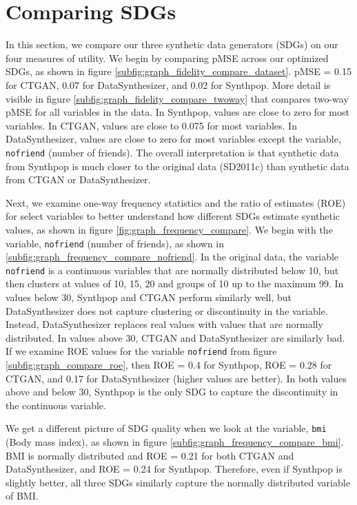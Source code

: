 \documentclass[runningheads]{llncs}
\begin{document}
\section{Comparing SDGs}\label{sec:results}

In this section, we compare our three synthetic data generators (SDGs) on our four measures of utility.  We begin by comparing pMSE across our optimized SDGs, as shown in figure \ref{subfig:graph_fidelity_compare_dataset}.  pMSE = 0.15 for CTGAN, 0.07 for DataSynthesizer, and 0.02 for Synthpop.  More detail is visible in figure  \ref{subfig:graph_fidelity_compare_twoway} that compares two-way pMSE for all variables in the data.  In Synthpop, values are close to zero for most variables.  In CTGAN, values are close to 0.075 for most variables.  In DataSynthesizer, values are close to zero for most variables except the variable, \texttt{nofriend} (number of friends).  The overall interpretation is that synthetic data from Synthpop is much closer to the original data (SD2011c) than synthetic data from CTGAN or DataSynthesizer.

Next, we examine one-way frequency statistics and the ratio of estimates (ROE) for select variables to better understand how different SDGs estimate synthetic values, as shown in figure \ref{fig:graph_frequency_compare}.  We begin with  the variable, \texttt{nofriend} (number of friends), as shown in \ref{subfig:graph_frequency_compare_nofriend}.  In the original data, the variable \texttt{nofriend} is a continuous variables that are normally distributed below 10, but then clusters at values of 10, 15, 20 and groups of 10 up to the maximum 99.  In values below 30, Synthpop and CTGAN perform similarly well, but DataSynthesizer does not capture clustering or discontinuity in the variable.  Instead, DataSynthesizer replaces real values with values that are normally distributed.  In values above 30, CTGAN and DataSynthesizer are similarly bad.  If we examine ROE values for the variable  \texttt{nofriend} from figure \ref{subfig:graph_compare_roe}, then ROE = 0.4 for Synthpop, ROE = 0.28 for CTGAN, and 0.17 for DataSynthesizer (higher values are better).  In both values above and below 30, Synthpop is the only SDG to capture the discontinuity in the continuous variable.  

We get a different picture of SDG quality when we look at the variable, \texttt{bmi} (Body mass index), as shown in figure \ref{subfig:graph_frequency_compare_bmi}.  BMI is normally distributed and ROE = 0.21 for both CTGAN and DataSynthesizer, and ROE = 0.24 for Synthpop.  Therefore, even if Synthpop is slightly better, all three SDGs similarly capture the normally distributed variable of BMI.  
\end{document}
